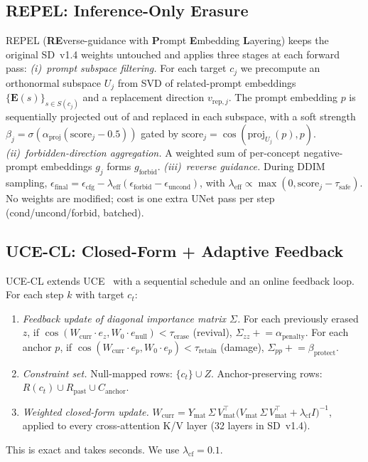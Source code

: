 \documentclass[10pt,twocolumn,letterpaper]{article}
\begin{document}
\subsection{REPEL: Inference-Only Erasure}
\label{sec:algA}
REPEL (\textbf{RE}verse-guidance with \textbf{P}rompt \textbf{E}mbedding
\textbf{L}ayering) keeps the original SD~v1.4 weights untouched and
applies three stages at each forward pass:
\emph{(i)~prompt subspace filtering.} For each target $c_j$ we precompute
an orthonormal subspace $U_j$ from SVD of related-prompt embeddings
$\{\mathbf{E}(s)\}_{s\in S(c_j)}$ and a replacement direction
$v_{\text{rep},j}$. The prompt embedding $p$ is sequentially projected
out of and replaced in each subspace, with a soft strength
$\beta_j = \sigma(\alpha_\text{proj}(\mathrm{score}_j - 0.5))$ gated by
$\mathrm{score}_j = \cos(\mathrm{proj}_{U_j}(p), p)$.
\emph{(ii)~forbidden-direction aggregation.} A weighted sum of per-concept
negative-prompt embeddings $g_j$ forms $g_\text{forbid}$.
\emph{(iii)~reverse guidance.} During DDIM sampling,
$\epsilon_\text{final} \!=\! \epsilon_\text{cfg} -
\lambda_\text{eff}(\epsilon_\text{forbid} - \epsilon_\text{uncond})$,
with $\lambda_\text{eff} \propto \max(0,\mathrm{score}_j - \tau_\text{safe})$.
No weights are modified; cost is one extra UNet pass per step
(cond/uncond/forbid, batched).

\subsection{UCE-CL: Closed-Form + Adaptive Feedback}
\label{sec:algB}
UCE-CL extends UCE~\cite{gandikota2024uce} with a sequential schedule and
an online feedback loop. For each step $k$ with target $c_t$:
\begin{enumerate}\itemsep1pt
\item \emph{Feedback update of diagonal importance matrix $\Sigma$.}
For each previously erased $z$, if
$\cos(W_\text{curr}\!\cdot e_z, W_0\!\cdot e_\text{null}) < \tau_\text{erase}$
(revival), $\Sigma_{zz} \!\mathrel{+}=\! \alpha_\text{penalty}$. For
each anchor $p$, if
$\cos(W_\text{curr}\!\cdot e_p, W_0\!\cdot e_p) < \tau_\text{retain}$
(damage), $\Sigma_{pp} \!\mathrel{+}=\! \beta_\text{protect}$.
\item \emph{Constraint set.} Null-mapped rows: $\{c_t\}\cup Z$.
Anchor-preserving rows: $R(c_t) \cup R_\text{past} \cup C_\text{anchor}$.
\item \emph{Weighted closed-form update.}
$W_\text{curr} \!=\! Y_\text{mat}\, \Sigma\, V_\text{mat}^\top
\bigl(V_\text{mat}\, \Sigma\, V_\text{mat}^\top + \lambda_\text{cf} I\bigr)^{-1}$,
applied to every cross-attention K/V layer (32 layers in SD~v1.4).
\end{enumerate}
This is exact and takes seconds. We use $\lambda_\text{cf}{=}0.1$.
\end{document}
